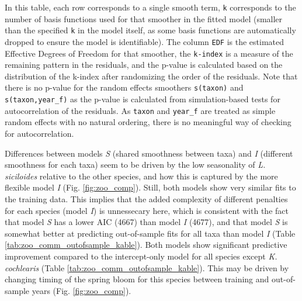 \documentclass[12pt]{article}
\begin{document}
In this table, each row corresponds to a single smooth term,
\texttt{k\textquotesingle{}} corresponds to the number of basis
functions used for that smoother in the fitted model (smaller than the
specified \texttt{k} in the model itself, as some basis functions are
automatically dropped to ensure the model is identifiable). The column
\texttt{EDF} is the estimated Effective Degrees of Freedom for that
smoother, the \texttt{k-index} is a measure of the remaining pattern in
the residuals, and the p-value is calculated based on the distribution
of the k-index after randomizing the order of the residuals. Note that
there is no p-value for the random effects smoothers \texttt{s(taxon)}
and \texttt{s(taxon,year\_f)} as the p-value is calculated from
simulation-based tests for autocorrelation of the residuals. As
\texttt{taxon} and \texttt{year\_f} are treated as simple random effects
with no natural ordering, there is no meaningful way of checking for
autocorrelation.

Differences between models \emph{S} (shared smoothness between taxa) and
\emph{I} (different smoothness for each taxa) seem to be driven by the
low seasonality of \emph{L. siciloides} relative to the other species,
and how this is captured by the more flexible model \emph{I} (Fig.
\ref{fig:zoo_comp}). Still, both models show very similar fits to the
training data. This implies that the added complexity of different
penalties for each species (model \emph{I}) is unnessecary here, which
is consistent with the fact that model \emph{S} has a lower AIC (4667)
than model \emph{I} (4677), and that model \emph{S} is somewhat better
at predicting out-of-sample fits for all taxa than model \emph{I} (Table
\ref{tab:zoo_comm_outofsample_kable}). Both models show significant
predictive improvement compared to the intercept-only model for all
species except \emph{K. cochlearis} (Table
\ref{tab:zoo_comm_outofsample_kable}). This may be driven by changing
timing of the spring bloom for this species between training and
out-of-sample years (Fig. \ref{fig:zoo_comp}).
\end{document}
